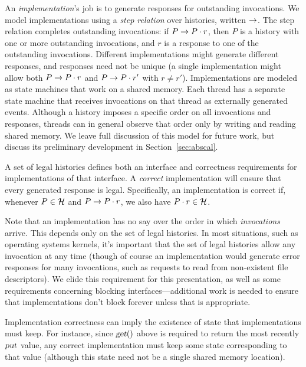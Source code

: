 An \emph{implementation}'s job is to generate responses for outstanding
invocations.
%
We model implementations using a \emph{step relation} over histories,
written $\rightarrow$.
%
The step relation completes outstanding invocations: if $P \rightarrow P\cdot
r$, then $P$ is a history with one or more outstanding invocations, and
$r$ is a response to one of the outstanding invocations.
%
Different implementations might generate different responses, and
responses need not be unique (a single implementation might allow both
$P \rightarrow P\cdot r$ and $P \rightarrow P\cdot r'$ with $r \neq r'$).
%
Implementations are modeled as state machines that work on a shared
memory.
%
Each thread has a separate state machine that receives invocations on
that thread as externally generated events.
%
Although a history imposes a specific order on all invocations and
responses, threads can in general observe that order only by
writing and reading shared memory.
%
We leave full discussion of this model for future work, but
discuss its preliminary development in Section~\ref{sec:abscal}.

A set of legal histories defines both an interface and correctness
requirements for implementations of that interface.
%
A \emph{correct} implementation will ensure that every generated response is
legal.
%
Specifically, an implementation is correct if, whenever $P \in
\mathcal{H}$ and  $P \rightarrow P\cdot r$, we also have $P\cdot r \in
\mathcal{H}$.

Note that an implementation has no say over the order in which
\emph{invocations} arrive.
%
This depends only on the set of legal histories.
%
In most situations, such as operating systems kernels, it's important
that the set of legal histories allow any invocation at any time (though
of course an implementation would generate error responses for many
invocations, such as requests to read from non-existent file
descriptors).
%
We elide this requirement for this presentation, as well as some requirements concerning blocking
interfaces---additional work is needed to ensure that implementations
don't block forever unless that is appropriate.


Implementation correctness can imply the existence of state
that implementations must keep.
%
For instance, since $\textsl{get}()$ above is required to return
the most recently $\textsl{put}$ value, any correct implementation must keep
some state corresponding to that value (although this state need not be
a single shared memory location).


